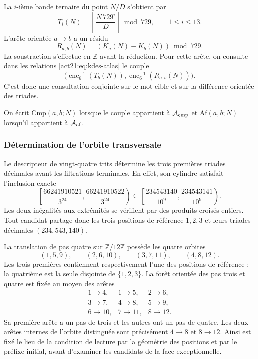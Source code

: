 La $i$-ième bande ternaire du point $N/D$ s'obtient par
\begin{equation}
 T_i(N)=\left\lfloor\frac{N\,729^i}{D}\right\rfloor\bmod729,
 \qquad1\leq i\leq13.
 \label{act21:eq:kdes-tercandidato}
\end{equation}
L'arête orientée $a\to b$ a un résidu
\begin{equation}
 R_{a,b}(N)=(K_a(N)-K_b(N))\bmod729.
 \label{act21:eq:kdes-resarista}
\end{equation}
La soustraction s'effectue en $\mathbb Z$ avant la réduction. Pour cette
arête, on consulte dans les relations \eqref{act21:eq:kdes-atlas} le couple
\[
 \bigl(\operatorname{enc}_6^{-1}(T_b(N)),
  \operatorname{enc}_6^{-1}(R_{a,b}(N))\bigr).
\]
C'est donc une consultation conjointe sur le mot cible et sur la différence orientée des triades.

On écrit $\mathrm{Cmp}(a,b;N)$ lorsque le couple appartient à $\mathcal A_{\rm cmp}$ et $\mathrm{Af}(a,b;N)$ lorsqu'il appartient à $\mathcal A_{\rm af}$.

\subsubsection{Détermination de l'orbite transversale}

Le descripteur de vingt-quatre trits détermine les trois premières triades décimales avant les filtrations terminales. En effet, son cylindre satisfait l'inclusion exacte
\[
 \left[\frac{66241910521}{3^{24}},
       \frac{66241910522}{3^{24}}\right)
 \subseteq
 \left[\frac{234543140}{10^9},
       \frac{234543141}{10^9}\right).
\]
Les deux inégalités aux extrémités se vérifient par des produits croisés
entiers. Tout candidat partage donc les trois positions de
référence $1,2,3$ et leurs triades décimales $(234,543,140)$.

La translation de pas quatre sur $\mathbb Z/12\mathbb Z$ possède les
quatre orbites
\[
 (1,5,9),\qquad(2,6,10),\qquad(3,7,11),\qquad(4,8,12).
\]
Les trois premières contiennent respectivement l'une des positions de référence ; la quatrième est la seule disjointe de $\{1,2,3\}$. La forêt orientée des pas trois et quatre est fixée au moyen des arêtes
\[
 \begin{array}{lll}
 1\to4,&1\to5,&2\to6,\\
 3\to7,&4\to8,&5\to9,\\
 6\to10,&7\to11,&8\to12.
 \end{array}
\]
Sa première arête a un pas de trois et les autres ont un pas de quatre. Les deux
arêtes internes de l'orbite distinguée sont précisément
$4\to8$ et $8\to12$. Ainsi est fixé le lieu de la condition de
lecture par la géométrie des positions et par le préfixe initial,
avant d'examiner les candidats de la face exceptionnelle.

